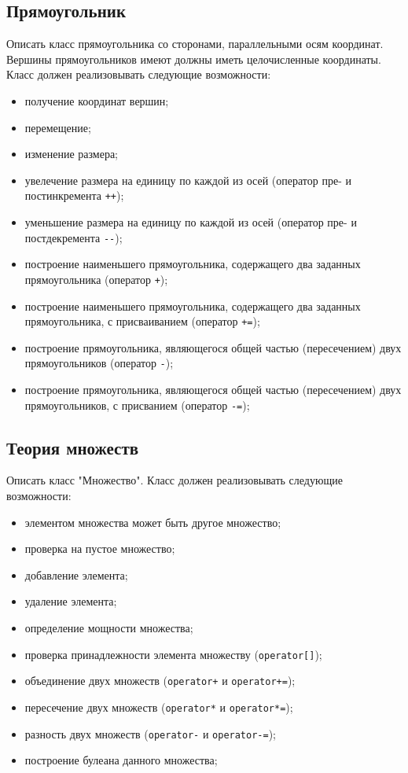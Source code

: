 \documentclass[a4paper,12pt]{article}
\begin{document}
\subsection{Прямоугольник}

Описать класс прямоугольника со сторонами, параллельными осям
координат. Вершины прямоугольников имеют должны иметь целочисленные
координаты. Класс должен реализовывать следующие возможности:

\begin{itemize}
\item получение координат вершин;
\item перемещение;
\item изменение размера;
\item увелечение размера на единицу по каждой из осей (оператор пре- и
  постинкремента \lstinline|++|);
\item уменьшение размера на единицу по каждой из осей (оператор пре- и
  постдекремента \lstinline|--|);
\item построение наименьшего прямоугольника, содержащего два заданных
  прямоугольника (оператор \lstinline|+|);
\item построение наименьшего прямоугольника, содержащего два заданных
  прямоугольника, с присваиванием (оператор \lstinline|+=|);
\item построение прямоугольника, являющегося общей частью
  (пересечением) двух прямоугольников (оператор \lstinline|-|);
\item построение прямоугольника, являющегося общей частью
  (пересечением) двух прямоугольников, с присванием (оператор
  \lstinline|-=|);
\end{itemize}

\subsection{Теория множеств}

Описать класс "Множество".
Класс должен реализовывать следующие возможности:

\begin{itemize}
\item элементом множества может быть другое множество;
\item проверка на пустое множество;
\item добавление элемента;
\item удаление элемента;
\item определение мощности множества;
\item проверка принадлежности элемента множеству (\lstinline|operator[]|);
\item объединение двух множеств (\lstinline|operator+| и \lstinline|operator+=|);
\item пересечение двух множеств (\lstinline|operator*| и \lstinline|operator*=|);
\item разность двух множеств (\lstinline|operator-| и \lstinline|operator-=|);
\item построение булеана данного множества;
\end{itemize}
\end{document}
